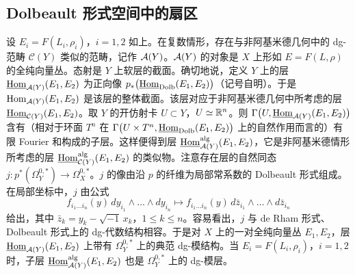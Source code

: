 \subsection{Dolbeault 形式空间中的扇区}

设 $E_i=F(L_i,\rho_i)$，$i=1,2$ 如上。在复数情形，存在与非阿基米德几何中的 dg-范畴 $\mathcal C(Y)$ 类似的范畴，记作 $\mathcal{A}(Y)$。$\mathcal{A}(Y)$ 的对象是 $X$ 上形如 $E=F(L,\rho)$ 的全纯向量丛。态射是 $Y$ 上软层的截面。确切地说，定义 $Y$ 上的层 $\underline{\operatorname{Hom}}_{\mathcal{A}(Y)}(E_1,E_2)$ 为正向像 $p_*\bigl(\underline{\operatorname{Hom}}_{\mathrm{Dolb}}(E_1,E_2)\bigr)$（记号自明）。于是 $\operatorname{Hom}_{\mathcal{A}(Y)}(E_1,E_2)$ 是该层的整体截面。该层对应于非阿基米德几何中所考虑的层 $\underline{\operatorname{Hom}}_{\mathcal C(Y)}(E_1,E_2)$。取 $Y$ 的开仿射卡 $U\subset Y$，$U\simeq\mathbb{R}^n$。则 $\Gamma\bigl(U,\underline{\operatorname{Hom}}_{\mathcal{A}(Y)}(E_1,E_2)\bigr)$ 含有（相对于环面 $T^n$ 在 $\Gamma\bigl(U\times T^n,\underline{\operatorname{Hom}}_{\mathrm{Dolb}}(E_1,E_2)\bigr)$ 上的自然作用而言的）有限 Fourier 和构成的子层。这样便得到层 $\underline{\operatorname{Hom}}^{\mathrm{alg}}_{\mathcal{A}(Y)}(E_1,E_2)$，它是非阿基米德情形所考虑的层 $\underline{\operatorname{Hom}}^{\mathrm{alg}}_{\mathcal C(Y)}(E_1,E_2)$ 的类似物。注意存在层的自然同态 $j:p^{*}(\Omega^{0,*}_Y)\to\Omega^{0,*}_X$。$j$ 的像由沿 $p$ 的纤维为局部常系数的 Dolbeault 形式组成。在局部坐标中，$j$ 由公式
\[
f_{i_1\dots i_n}(y)\,dy_{i_1}\wedge\dots\wedge dy_{i_n}\longmapsto
f_{i_1\dots i_n}(y)\,d\bar z_{i_1}\wedge\dots\wedge d\bar z_{i_n}
\]
给出，其中 $\bar z_k=y_k-\sqrt{-1}\,x_k$，$1\le k\le n$。容易看出，$j$ 与 de Rham 形式、Dolbeault 形式上的 dg-代数结构相容。于是对 $X$ 上的一对全纯向量丛 $E_1,E_2$，层 $\underline{\operatorname{Hom}}_{\mathcal{A}(Y)}(E_1,E_2)$ 上带有 $\Omega^{0,*}_Y$ 上的典范 dg-模结构。当 $E_i=F(L_i,\rho_i)$，$i=1,2$ 时，子层 $\underline{\operatorname{Hom}}^{\mathrm{alg}}_{\mathcal{A}(Y)}(E_1,E_2)$ 也是 $\Omega^{0,*}_Y$ 上的 dg-模层。

